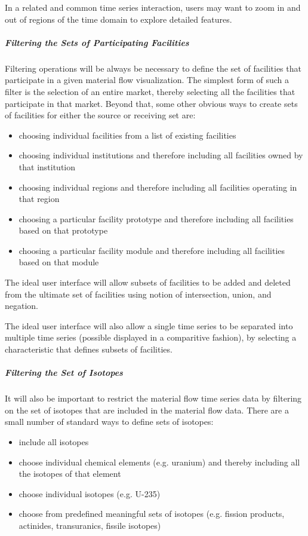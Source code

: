 \documentclass[letterpaper,10pt,english]{sphinxmanual}
\begin{document}
In a related and common time series interaction, users may want to
zoom in and out of regions of the time domain to explore detailed
features.


\subparagraph{Filtering the Sets of Participating Facilities}
\label{devdoc/output_usecases:filtering-the-sets-of-participating-facilities}
Filtering operations will be always be necessary to define the set of
facilities that participate in a given material flow visualization.
The simplest form of such a filter is the selection of an entire
market, thereby selecting all the facilities that participate in that
market.  Beyond that, some other obvious ways to create sets of
facilities for either the source or receiving set are:
\begin{itemize}
\item {} 
choosing individual facilities from a list of existing facilities

\item {} 
choosing individual institutions and therefore including all
facilities owned by that institution

\item {} 
choosing individual regions and therefore including all facilities
operating in that region

\item {} 
choosing a particular facility prototype and therefore including
all facilities based on that prototype

\item {} 
choosing a particular facility module and therefore including all
facilities based on that module

\end{itemize}

The ideal user interface will allow subsets of facilities to be added
and deleted from the ultimate set of facilities using notion of
intersection, union, and negation.

The ideal user interface will also allow a single time series to be
separated into multiple time series (possible displayed in a
comparitive fashion), by selecting a characteristic that defines
subsets of facilities.


\subparagraph{Filtering the Set of Isotopes}
\label{devdoc/output_usecases:filtering-the-set-of-isotopes}
It will also be important to restrict the material flow time series
data by filtering on the set of isotopes that are included in the
material flow data.  There are a small number of standard ways to
define sets of isotopes:
\begin{itemize}
\item {} 
include all isotopes

\item {} 
choose individual chemical elements (e.g. uranium) and thereby
including all the isotopes of that element

\item {} 
choose individual isotopes (e.g. U-235)

\item {} 
choose from predefined meaningful sets of isotopes
(e.g. fission products, actinides, transuranics, fissile isotopes)

\end{itemize}
\end{document}
